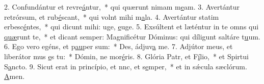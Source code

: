 2. Confundántur et revre\uline{á}ntur,~* qui quærunt nimam m\uline{e}am.
3. Avertántur retrórsum, et rub\uline{é}scant,~* qui volnt mihi m\uline{a}la.
4. Avertántur statim erbesc\uline{é}ntes,~* qui dicunt mihi: uge, \uline{e}uge.
5. Exsúltent et læténtur in te omns qui \uline{quæ}runt te,~* et dicant semper: Magnificétur Dóminus: qui díligunt saltáre t\uline{u}um.
6. Ego vero egéns, et p\uline{au}per sum:~* Des, ádjuv\uline{a} me.
7. Adjútor meus, et liberátor mus \uline{e}s tu:~* Dómin, ne mor\uline{é}ris.
8. Glória Patr, et F\uline{í}lio,~* et Spirtui S\uline{a}ncto.
9. Sicut erat in princípio, et nnc, et s\uline{e}mper,~* et in sǽcula sæclórum. \uline{A}men.
